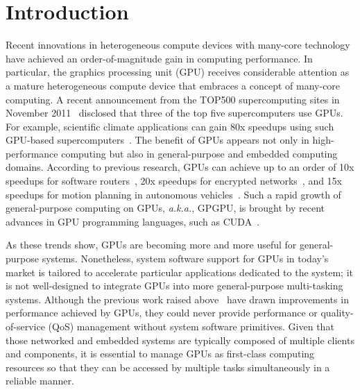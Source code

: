 \vspace{-0.25em}
\section{Introduction}
\label{sec:introduction}
\vspace{-0.25em}

Recent innovations in heterogeneous compute devices with many-core
technology have achieved an order-of-magnitude gain in computing
performance. 
In particular, the graphics processing unit (GPU) receives considerable
attention as a mature heterogeneous compute device that embraces a
concept of many-core computing.
A recent announcement from the TOP500 supercomputing sites in November
2011~\cite{TOP500} disclosed that three of the top five supercomputers
use GPUs.
For example, scientific climate applications can gain 80x speedups using
such GPU-based supercomputers~\cite{Shimokawabe10}.
The benefit of GPUs appears not only in high-performance computing but
also in general-purpose and embedded computing domains.
According to previous research, GPUs can achieve up to an order of 10x
speedups for software routers~\cite{Han_SIGCOMM10}, 20x speedups for
encrypted networks~\cite{Jang_NSDI11}, and 15x speedups for motion
planning in autonomous vehicles~\cite{McNaughton_ICRA11}.
Such a rapid growth of general-purpose computing on GPUs,
\textit{a.k.a.}, GPGPU, is brought by recent advances in GPU
programming languages, such as CUDA~\cite{CUDA40}.

As these trends show, GPUs are becoming more and more useful for
general-purpose systems.
Nonetheless, system software support for GPUs in today's market is
tailored to accelerate particular applications dedicated to the
system; it is not well-designed to integrate GPUs into more
general-purpose multi-tasking systems.
Although the previous work raised above~\cite{Han_SIGCOMM10,
Jang_NSDI11, McNaughton_ICRA11} have drawn improvements in performance
achieved by GPUs, they could never provide performance or
quality-of-service (QoS) management without system software primitives.
Given that those networked and embedded systems are typically composed
of multiple clients and components, it is essential to manage GPUs as
first-class computing resources so that they can be accessed by multiple
tasks simultaneously in a reliable manner.

